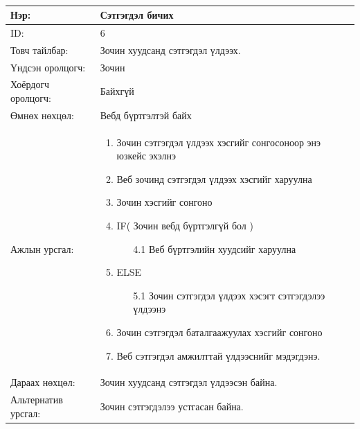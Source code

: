 \begin{center}
	\begin{table}[!htbp]
		\caption{} 
		\begin{tabular}{|p{4cm}|p{11cm}|}
			\hline
			Нэр: & Сэтгэгдэл бичих  \\
			\hline
			ID: & 6 \\
			\hline
			Товч тайлбар: & Зочин хуудсанд сэтгэгдэл үлдээх.  \\
			\hline
			Үндсэн оролцогч: & Зочин \\
			\hline
			Хоёрдогч оролцогч: & Байхгүй  \\
			\hline
			Өмнөх нөхцөл: &  Вебд бүртгэлтэй байх \\
			\hline
			Ажлын урсгал: & \begin{enumerate}
								\item Зочин сэтгэгдэл үлдээх хэсгийг сонгосоноор энэ юзкейс эхэлнэ
								\item Веб зочинд сэтгэгдэл үлдээх хэсгийг харуулна
								\item Зочин хэсгийг сонгоно
								\item IF( Зочин вебд бүртгэлгүй бол )
									\begin{enumerate}
										\item[4.1] Веб бүртгэлийн хуудсийг харуулна
									\end{enumerate}
								\item ELSE
									\begin{enumerate}
										\item[5.1] Зочин сэтгэгдэл үлдээх хэсэгт сэтгэгдэлээ үлдээнэ
									\end{enumerate}
								\item Зочин сэтгэгдэл баталгаажуулах хэсгийг сонгоно
								\item Веб сэтгэгдэл амжилттай үлдээснийг мэдэгдэнэ.
							\end{enumerate} 	
\\				\hline
			Дараах нөхцөл: & Зочин хуудсанд сэтгэгдэл үлдээсэн байна. \\
			\hline
			Альтернатив урсгал: & Зочин сэтгэгдэлээ устгасан байна. \\
			\hline
		\end{tabular}
	\end{table}
\end{center}

